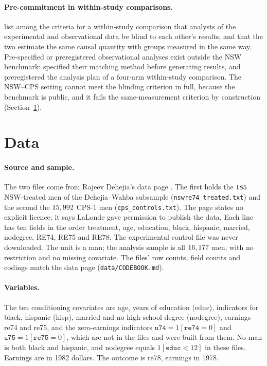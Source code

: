 \documentclass[11pt]{article}
\newcommand{\var}[1]{\texttt{#1}}
\begin{document}
\paragraph{Pre-commitment in within-study comparisons.} \citet{cook2008} list among the
criteria for a within-study comparison that analysts of the experimental and observational
data be blind to each other's results, and that the two estimate the same causal quantity
with groups measured in the same way. Pre-specified or preregistered observational analyses
exist outside the NSW benchmark: \citet{weidmann2021} specified their matching method before
generating results, and \citet{keller2024} preregistered the analysis plan of a four-arm
within-study comparison. The NSW--CPS setting cannot meet the blinding criterion in full,
because the benchmark is public, and it fails the same-measurement criterion by
construction (Section~\ref{sec:data}).

\section{Data}
\label{sec:data}

\paragraph{Source and sample.} The two files come from Rajeev Dehejia's data page
\citep{dehejiadata}. The first holds the $185$ NSW-treated men of the
Dehejia--Wahba subsample (\var{nswre74\_treated.txt}) and the second the $15,992$
CPS-1 men (\var{cps\_controls.txt}). The
page states no explicit licence; it says LaLonde gave permission to publish the data. Each
line has ten fields in the order treatment, age, education, black, hispanic, married,
nodegree, RE74, RE75 and RE78. The experimental control file was never downloaded. The unit
is a man; the analysis sample is all $16,177$ men, with no restriction and no missing
covariate. The files' row counts, field counts and codings match the data page
(\var{data/CODEBOOK.md}).

\paragraph{Variables.} The ten conditioning covariates are age, years of education (educ),
indicators for black, hispanic (hisp), married and no high-school degree (nodegree),
earnings re74 and re75, and the zero-earnings indicators $\var{u74} = 1[\var{re74} = 0]$ and
$\var{u75} = 1[\var{re75} = 0]$, which are not in the files and were built from them. No man is
both black and hispanic, and nodegree equals $1[\var{educ} < 12]$ in these files. Earnings
are in 1982 dollars. The outcome is re78, earnings in 1978.
\end{document}
